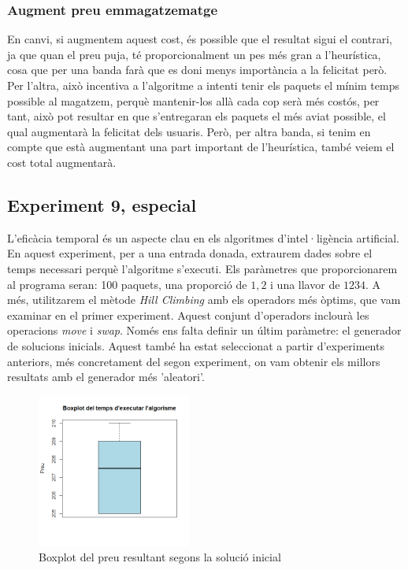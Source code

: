 \documentclass[a4paper]{article}
\begin{document}
	\subsubsection{Augment preu emmagatzematge}

	En canvi, si augmentem aquest cost, és possible que el resultat sigui el contrari, ja que quan el preu puja, té proporcionalment un pes més gran a l'heurística, cosa que per una banda farà que es doni menys importància a la felicitat però. Per l'altra, això incentiva a l'algoritme a intenti tenir els paquets el mínim temps possible al magatzem, perquè mantenir-los allà cada cop serà més costós, per tant, això pot resultar en que s'entregaran els paquets el més aviat possible, el qual augmentarà la felicitat dels usuaris. Però, per altra banda, si tenim en compte que està augmentant una part important de l'heurística, també veiem el cost total augmentarà.\\


	\subsection{Experiment 9, especial}
	
	L'eficàcia temporal és un aspecte clau en els algoritmes d'intel·ligència artificial. En aquest experiment, per a una entrada donada, extraurem dades sobre el temps necessari perquè l'algoritme s'executi. Els paràmetres que proporcionarem al programa seran: 100 paquets, una proporció de $1,2$ i una llavor de $1234$. A més, utilitzarem el mètode \textit{Hill Climbing} amb els operadors més òptims, que vam examinar en el primer experiment. Aquest conjunt d'operadors inclourà les operacions \textit{move} i \textit{swap}. Només ens falta definir un últim paràmetre: el generador de solucions inicials. Aquest també ha estat seleccionat a partir d'experiments anteriors, més concretament del segon experiment, on vam obtenir els millors resultats amb el generador més 'aleatori'. \\
	
	\begin{figure}[H]
		\centering
		\includegraphics[width=0.45\textwidth]{images/exp9_boxplot.png}
		\caption{Boxplot del preu resultant segons la solució inicial}
		\label{fig:exp9_boxplot}
	\end{figure}
	
\end{document}
